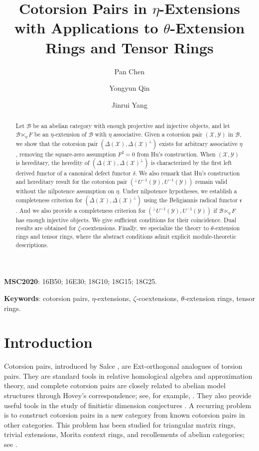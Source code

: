\documentclass[11pt,reqno]{amsart}
\title[Cotorsion Pairs in $\eta$-Extensions]{Cotorsion Pairs in $\eta$-Extensions with Applications to $\theta$-Extension Rings and Tensor Rings}
\author{Pan Chen}
\author{Yongyun Qin}
\author{Jinrui Yang}
\numberwithin{equation}{section}
\newcommand{\cB}{\mathcal B}
\newcommand{\cX}{\mathcal X}
\newcommand{\cY}{\mathcal Y}
\newcommand{\radf}{\mathfrak r}
\begin{document}
\begin{abstract}
Let $\cB$ be an abelian category with enough projective and injective objects, and let $\cB\ltimes_\eta F$ be an $\eta$-extension of $\cB$ with $\eta$ associative.
Given a cotorsion pair $(\cX, \cY)$ in $\cB$, we show that the cotorsion pair $(\Delta(\cX),\Delta(\cX)^\perp)$ exists for arbitrary associative $\eta$, removing the square-zero assumption $F^2=0$ from Hu's construction. When $(\cX, \cY)$ is hereditary, the heredity of $(\Delta(\cX),\Delta(\cX)^\perp)$ is characterized by the first left derived functor of a canonical defect functor $\delta$. We also remark that Hu's construction and hereditary result for the cotorsion pair
$({}^\perp U^{-1}(\cY), U^{-1}(\cY))$ remain valid without the nilpotence assumption on $\eta$. Under nilpotence hypotheses, we establish a completeness criterion for
$(\Delta(\cX),\Delta(\cX)^\perp)$ using the Beligiannis radical functor $\radf$. And we also provide a completeness criterion for $({}^\perp U^{-1}(\cY), U^{-1}(\cY))$ if
$\cB\ltimes_\eta F$ has enough injective objects. We give sufficient conditions for their coincidence. Dual results are obtained for $\zeta$-coextensions. Finally, we specialize the theory to $\theta$-extension rings and tensor rings, where the abstract conditions admit explicit module-theoretic descriptions.
\end{abstract}

\maketitle

{\footnotesize {\bf MSC2020}:
		16B50; 16E30; 18G10; 18G15; 18G25.}
	
	\medskip
	
	{\footnotesize {\bf Keywords}: cotorsion pairs, $\eta$-extensions, $\zeta$-coextensions, $\theta$-extension rings, tensor rings. }

\section{Introduction}\label{section:introduction}

Cotorsion pairs, introduced by Salce \cite{Salce}, are Ext-orthogonal analogues of torsion pairs. They are standard tools in relative homological algebra and approximation theory, and complete cotorsion pairs are closely related to abelian model structures through Hovey's correspondence; see, for example, \cite{EnochsJenda,Gillespie,GobelTrlifaj,Hovey}. They also provide useful tools in the study of finitistic dimension conjectures \cite{AngeleriHernandez,AngeleriTrlifaj,WangLiHu}. A recurring problem is to construct cotorsion pairs in a new category from known cotorsion pairs in other categories. This problem has been studied for triangular matrix rings, trivial extensions, Morita context rings, and recollements of abelian categories; see \cite{Mao,ZhuPengDing,MaoTrivial,CuiRongZhang,YangQin}.
\end{document}
